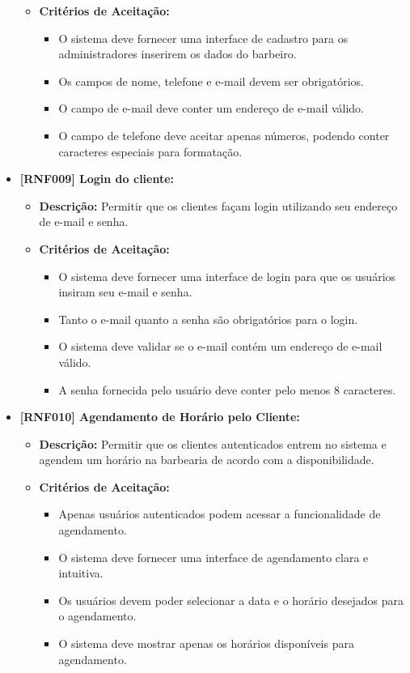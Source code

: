 \documentclass[12pt]{article}
\begin{document}
\begin{itemize}
\begin{itemize}
        \item \textbf{Critérios de Aceitação:}
        \begin{itemize}
            \item O sistema deve fornecer uma interface de cadastro para os administradores inserirem os dados do barbeiro.
            \item Os campos de nome, telefone e e-mail devem ser obrigatórios.
            \item O campo de e-mail deve conter um endereço de e-mail válido.
            \item O campo de telefone deve aceitar apenas números, podendo conter caracteres especiais para formatação.
        \end{itemize}
    \end{itemize}
    \item \textbf{[RNF009] Login do cliente:}
    \begin{itemize}
        \item \textbf{Descrição:} Permitir que os clientes façam login utilizando seu endereço de e-mail e senha.
        \item \textbf{Critérios de Aceitação:}
        \begin{itemize}
            \item O sistema deve fornecer uma interface de login para que os usuários insiram seu e-mail e senha.
            \item Tanto o e-mail quanto a senha são obrigatórios para o login.
            \item O sistema deve validar se o e-mail contém um endereço de e-mail válido.
            \item A senha fornecida pelo usuário deve conter pelo menos 8 caracteres.
        \end{itemize}
    \end{itemize}
    \item \textbf{[RNF010] Agendamento de Horário pelo Cliente:}
    \begin{itemize}
        \item \textbf{Descrição:} Permitir que os clientes autenticados entrem no sistema e agendem um horário na barbearia de acordo com a disponibilidade.
        \item \textbf{Critérios de Aceitação:}
        \begin{itemize}
            \item Apenas usuários autenticados podem acessar a funcionalidade de agendamento.
            \item O sistema deve fornecer uma interface de agendamento clara e intuitiva.
            \item Os usuários devem poder selecionar a data e o horário desejados para o agendamento.
            \item O sistema deve mostrar apenas os horários disponíveis para agendamento.
        \end{itemize}
    \end{itemize}
\end{itemize}
\end{document}
